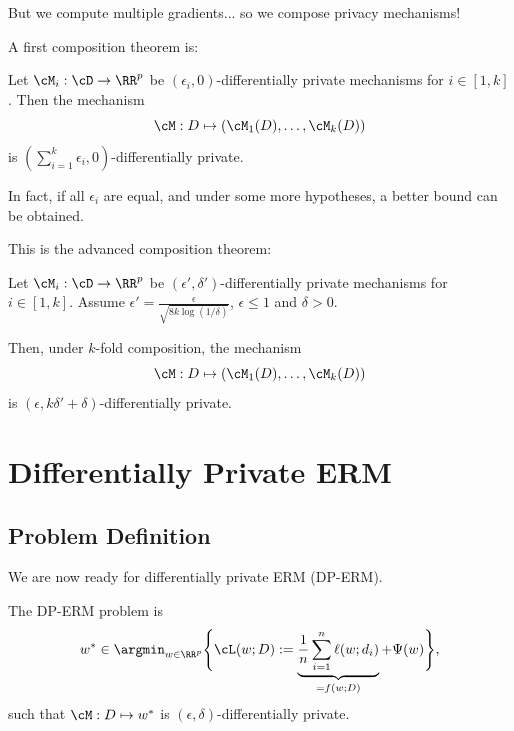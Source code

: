\documentclass[notheorems]{beamer}
\begin{document}
\begin{frame}
  But we compute multiple gradients... so we compose privacy mechanisms!

  \vspace{1em}

  A first composition theorem is:

  \begin{theorem}
    Let $\cM_i : \cD \rightarrow \RR^p$ be $(\epsilon_i, 0)$-differentially private mechanisms for $i \in [1, k]$.
    Then the mechanism
    $$\cM : D \mapsto (\cM_1(D), \dots, \cM_k(D))$$
    is $\left(\sum_{i=1}^k \epsilon_i, 0\right)$-differentially private.
  \end{theorem}
\end{frame}


\begin{frame}
  In fact, if all $\epsilon_i$ are equal, and under some more hypotheses, a better bound can be obtained.

  \vspace{1em}

  This is the advanced composition theorem:

  \begin{theorem}
    Let $\cM_i : \cD \rightarrow \RR^p$ be $(\epsilon', \delta')$-differentially private mechanisms for $i \in [1, k]$.
    Assume $\epsilon' = \frac{\epsilon}{\sqrt{8k\log(1/\delta)}}$, $\epsilon \le 1$ and $\delta > 0$.

    Then, under $k$-fold composition, the mechanism
    $$\cM : D \mapsto (\cM_1(D), \dots, \cM_k(D))$$
    is $\left(\epsilon, k\delta' + \delta\right)$-differentially private.
  \end{theorem}
\end{frame}

\section{Differentially Private ERM}
\label{sec:differentially_private_erm}

\subsection{Problem Definition}
\label{sub:problem_definition}


\begin{frame}
  We are now ready for differentially private ERM (DP-ERM).

  \vspace{1em}

  The DP-ERM problem is
  \begin{align}
    w^* \in \argmin_{w \in \RR^p} \Bigg\{ \cL(w; D) := \underbrace{\frac 1n \sum_{i=1}^n \ell(w; d_i)}_{= f(w; D)} + \Psi(w) \Bigg\},
  \end{align}
  such that $\cM : D \mapsto w^*$ is $(\epsilon, \delta)$-differentially private.
\end{frame}
\end{document}
